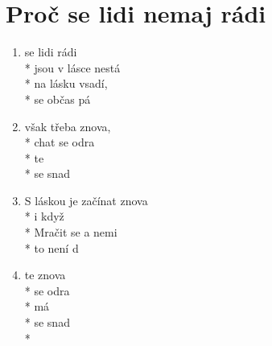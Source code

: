 \section{Proč se lidi nemaj rádi}
\begin{enumerate}
\item {} se lidi  rádi \\*
 jsou v lásce nestá   \\*
 na lásku          vsadí, \\*
 se občas pá 
\item {} však třeba  znova, \\*
chat se odra \\*
te    \\*
 se snad 
\item S láskou je  začínat  znova \\*
i když   \\*
Mračit se  a nemi  \\*
to není d   
\item {}te  znova \\*
 se odra \\*
   má  \\*
 se snad  \\*
\end{enumerate}
